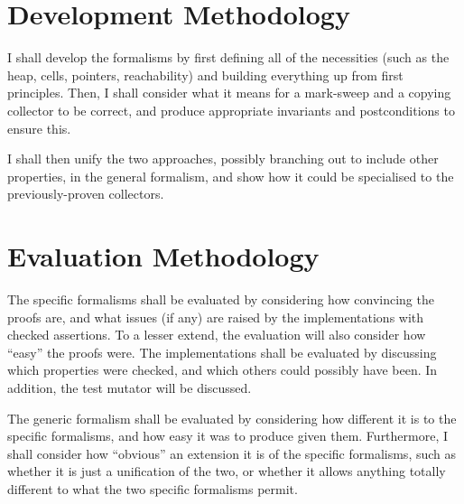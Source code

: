 \section{Development Methodology}
\label{sec:analysis-formalism}

I shall develop the formalisms by first defining all of the
necessities (such as the heap, cells, pointers, reachability) and
building everything up from first principles. Then, I shall consider
what it means for a mark-sweep and a copying collector to be correct,
and produce appropriate invariants and postconditions to ensure this.

I shall then unify the two approaches, possibly branching out to
include other properties, in the general formalism, and show how it
could be specialised to the previously-proven collectors.

\section{Evaluation Methodology}
\label{sec:analysis-evaluation}

The specific formalisms shall be evaluated by considering how
convincing the proofs are, and what issues (if any) are raised by the
implementations with checked assertions. To a lesser extend, the
evaluation will also consider how ``easy'' the proofs were. The
implementations shall be evaluated by discussing which properties were
checked, and which others could possibly have been. In addition, the
test mutator will be discussed.

The generic formalism shall be evaluated by considering how different
it is to the specific formalisms, and how easy it was to produce given
them. Furthermore, I shall consider how ``obvious'' an extension it is
of the specific formalisms, such as whether it is just a unification
of the two, or whether it allows anything totally different to what
the two specific formalisms permit.
